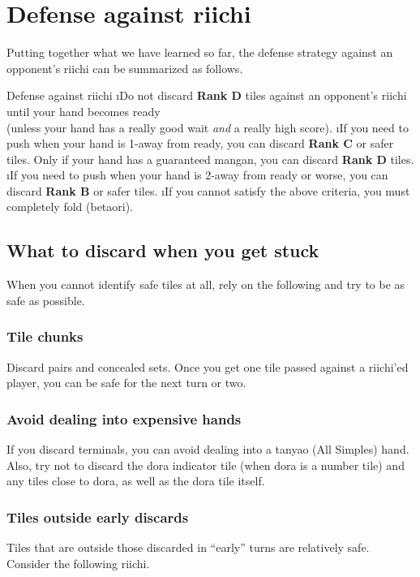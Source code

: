 {{\newpage
\section{Defense against riichi} \label{sec:defense_riichi}

Putting together what we have learned so far, the defense strategy against an opponent's riichi can be summarized as follows. 

\begin{itembox}[c]{Defense against riichi}
\bi
\i Do not discard {\bf Rank D} tiles against an opponent's riichi until your 
hand becomes ready\\(unless your hand has a really good wait \emph{and} a really high score).
\i If you need to push when your hand is 1-away from ready, you can
discard {\bf Rank C} or safer tiles. Only if your hand has a guaranteed {\jap mangan}, you can discard {\bf Rank D} tiles. 
\i If you need to push when your hand is 2-away from ready or worse,
you can discard {\bf Rank B} or safer tiles. 
\i If you cannot satisfy the above criteria, you must completely fold ({\jap betaori}). 
\ei
\end{itembox}

\subsection{What to discard when you get stuck}
When you cannot identify safe tiles at all, rely on the following and try to be as safe as possible. 

\subsubsection*{Tile chunks}
Discard pairs and concealed sets. Once you get one tile passed against a riichi'ed player, you can be safe for the next turn or two. 

\subsubsection*{Avoid dealing into expensive hands}
If you discard terminals, you can avoid dealing into a {\jap tanyao} (All Simples) hand. 
Also, try not to discard the {\jap dora} indicator tile (when {\jap dora} is a number tile) and any tiles close to {\jap dora}, as well as the {\jap dora} tile itself.

\subsubsection*{Tiles outside early discards}
Tiles that are outside those discarded in ``early'' turns are relatively safe. 
Consider the following riichi. 

}}
